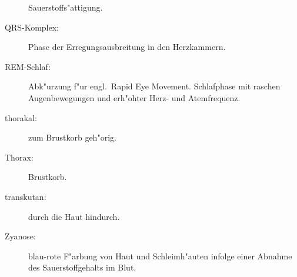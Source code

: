 \begin{description}
  Sauerstoffs"attigung.
\item[QRS-Komplex:] Phase der Erregungsausbreitung in den Herzkammern.
\item[REM-Schlaf:] Abk"urzung f"ur engl.\  Rapid Eye Movement. Schlafphase mit raschen
  Augenbewegungen und erh"ohter Herz- und Atemfrequenz.
\item[thorakal:] zum Brustkorb geh"orig.
\item[Thorax:] Brustkorb.
\item[transkutan:] durch die Haut hindurch.
\item[Zyanose:] blau-rote F"arbung von Haut und Schleimh"auten infolge einer Abnahme des
  Sauerstoffgehalts im Blut.
\end{description}

